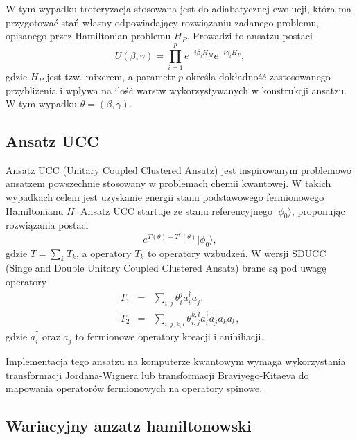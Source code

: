 \documentclass[a4paper,11pt]{article}
\newcommand{\ket}[1]{| #1 \rangle}
\begin{document}
W tym wypadku troteryzacja stosowana jest do adiabatycznej ewolucji, która ma przygotować stań własny odpowiadający rozwiązaniu zadanego problemu, opisanego przez Hamiltonian problemu $H_P$. Prowadzi to ansatzu postaci
\begin{equation}
	U(\beta,\gamma)  = \prod_{i=1}^{p} e^{-i\beta_i H_M} e^{-i\gamma_i H_P},
\end{equation}
gdzie $H_P$ jest tzw. mixerem, a parametr $p$ określa dokładność zastosowanego przybliżenia i wpływa na ilość warstw wykorzystywanych w konstrukcji ansatzu. W tym wypadku $\theta = (\beta,\gamma)$.

\subsection{Ansatz UCC}

Ansatz UCC (Unitary Coupled Clustered Ansatz) jest inspirowanym problemowo ansatzem powszechnie stosowany w problemach chemii kwantowej. W takich wypadkach celem jest uzyskanie energii stanu podstawowego fermionowego  Hamiltonianu $H$. Ansatz UCC startuje ze stanu referencyjnego $\ket{\phi_0}$, proponując rozwiązania postaci 
\begin{equation}
	e^{T(\theta)-T^\dagger(\theta)}\ket{\phi_0},
\end{equation}
gdzie $T = \sum_k T_k$, a operatory $T_k$ to operatory wzbudzeń. W wersji SDUCC (Singe and Double Unitary Coupled Clustered Ansatz) brane są pod uwagę operatory
\begin{eqnarray}
	T_1 &=& \sum_{i,j} \theta_i^ja^\dagger_i a^{\phantom\dagger}_j,\\
	T_2 &=& \sum_{i,j,k,l} \theta_{i,j}^{k,l}a^\dagger_i a^\dagger_j a^{\phantom\dagger}_k a^{\phantom\dagger}_l,
\end{eqnarray}
gdzie $a^{\dagger}_i$ oraz $a^{\phantom\dagger}_j$ to fermionowe operatory kreacji i anihiliacji.

Implementacja tego ansatzu na komputerze kwantowym wymaga wykorzystania transformacji Jordana-Wignera lub transformacji Braviyego-Kitaeva do mapowania operatorów fermionowych na operatory spinowe.

\subsection{Wariacyjny anzatz hamiltonowski}
\end{document}
